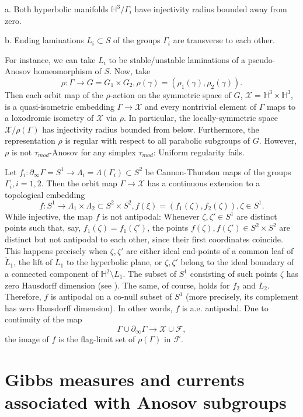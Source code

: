 \documentclass[12pt]{amsbook}%
\theoremstyle{definition}
\theoremstyle{remark}
\numberwithin{section}{chapter}
\numberwithin{subsection}{section}
\numberwithin{figure}{chapter}
\def\taumod{\tau_{mod}}
\def\bH{{\mathbb{H}}}
\def\cF{{\mathscr{F}}}
\def\cX{{\mathscr{X}}}
\def\Ga{\Gamma}
\def\ga{\gamma}
\def\La{\Lambda}
\def\geo{\partial_\infty}
\begin{document}
{{a. Both hyperbolic manifolds $\bH^3/\Ga_i$ have injectivity radius bounded away from zero. 

b. Ending laminations $L_i\subset S$ of the groups $\Ga_i$ are transverse to each other. 

For instance, we can take $L_i$ to be stable/unstable laminations of a pseudo-Anosov homeomorphism of $S$. Now, take 
$$
\rho: \Ga\to G=G_1\times G_2, \rho(\ga)=(\rho_1(\ga), \rho_2(\ga)). 
$$
Then each orbit map of the $\rho$-action on the symmetric space of $G$, $\cX=\bH^3\times \bH^3$, is a quasi-isometric embedding $\Ga\to \cX$ and  
every nontrivial element of $\Ga$ maps to a loxodromic isometry of $\cX$ via $\rho$. In particular, the locally-symmetric space $\cX/\rho(\Ga)$ has injectivity radius bounded from below. Furthermore, the representation $\rho$ is regular with respect to all parabolic subgroups of $G$. However, $\rho$ is not $\taumod$-Anosov for any simplex $\taumod$: Uniform regularity fails.  

Let $f_i: \geo \Ga=S^1\to \La_i=\La(\Ga_i)\subset S^2$ be Cannon-Thurston maps of the groups $\Ga_i, i=1,2$. Then the orbit map $\Ga\to \cX$ 
has a continuous extension to a topological embedding 
$$
f: S^1\to \La_1\times \La_2\subset S^2\times S^2, f(\xi)=(f_1(\zeta), f_2(\zeta)), \zeta\in S^1.
$$
While injective, the map $f$ is not antipodal: Whenever $\zeta, \zeta'\in S^1$ are distinct points such that, say, $f_1(\zeta)=f_1(\zeta')$, the points
$f(\zeta), f(\zeta')\in S^2\times S^2$ are distinct but not antipodal to each other, since their first coordinates coincide. This happens precisely when $\zeta, \zeta'$ 
are either ideal end-points of a common leaf of $\tilde L_1$, the lift of $L_1$ to the hyperbolic plane, or $\zeta, \zeta'$ belong to the ideal boundary 
of a connected component of $\bH^2\setminus L_1$. The subset of $S^1$ consisting of such points $\zeta$ has zero Hausdorff dimension 
(see \cite{Birman-Series}). The same, of course, holds for $f_2$ and $L_2$. Therefore, $f$ is antipodal on a co-null subset of $S^1$ (more precisely, 
its complement has zero Hausdorff dimension). In other words, $f$ is a.e. antipodal.  Due to continuity of the map
$$
\Ga \cup \geo \Ga\to \cX \cup \cF,
$$
the image of $f$ is the flag-limit set of $\rho(\Ga)$ in $\cF$. 




\section{Gibbs measures and currents associated with Anosov subgroups} \label{sec: Anosov Gibbs}


}}
\end{document}
